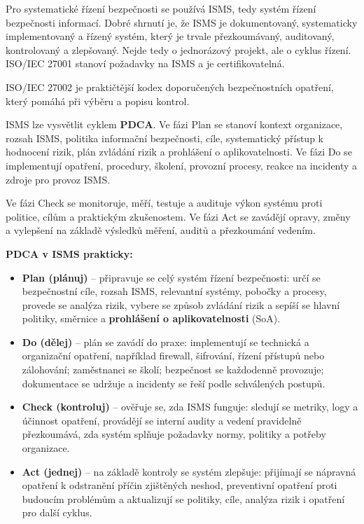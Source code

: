 Pro systematické řízení bezpečnosti se používá ISMS, tedy systém řízení bezpečnosti informací. Dobré shrnutí je, že ISMS je dokumentovaný, systematicky implementovaný a řízený systém, který je trvale přezkoumávaný, auditovaný, kontrolovaný a zlepšovaný. Nejde tedy o jednorázový projekt, ale o cyklus řízení. ISO/IEC 27001 stanoví požadavky na ISMS a je certifikovatelná.

ISO/IEC 27002 je praktičtější kodex doporučených bezpečnostních opatření, který pomáhá při výběru a popisu kontrol.

ISMS lze vysvětlit cyklem \textbf{PDCA}. Ve fázi Plan se stanoví kontext organizace, rozsah ISMS, politika informační bezpečnosti, cíle, systematický přístup k hodnocení rizik, plán zvládání rizik a prohlášení o aplikovatelnosti. Ve fázi Do se implementují opatření, procedury, školení, provozní procesy, reakce na incidenty a zdroje pro provoz ISMS.

Ve fázi Check se monitoruje, měří, testuje a audituje výkon systému proti politice, cílům a praktickým zkušenostem. Ve fázi Act se zavádějí opravy, změny a vylepšení na základě výsledků měření, auditů a přezkoumání vedením.

\begin{notebox}
\textbf{PDCA v ISMS prakticky:}
\begin{itemize}
  \item \textbf{Plan (plánuj)} -- připravuje se celý systém řízení bezpečnosti: určí se bezpečnostní cíle, rozsah ISMS, relevantní systémy, pobočky a procesy, provede se analýza rizik, vybere se způsob zvládání rizik a sepíší se hlavní politiky, směrnice a \textbf{prohlášení o aplikovatelnosti} (SoA).
  \item \textbf{Do (dělej)} -- plán se zavádí do praxe: implementují se technická a organizační opatření, například firewall, šifrování, řízení přístupů nebo zálohování; zaměstnanci se školí; bezpečnost se každodenně provozuje; dokumentace se udržuje a incidenty se řeší podle schválených postupů.
  \item \textbf{Check (kontroluj)} -- ověřuje se, zda ISMS funguje: sledují se metriky, logy a účinnost opatření, provádějí se interní audity a vedení pravidelně přezkoumává, zda systém splňuje požadavky normy, politiky a potřeby organizace.
  \item \textbf{Act (jednej)} -- na základě kontroly se systém zlepšuje: přijímají se nápravná opatření k odstranění příčin zjištěných neshod, preventivní opatření proti budoucím problémům a aktualizují se politiky, cíle, analýza rizik i opatření pro další cyklus.
\end{itemize}
\end{notebox}

